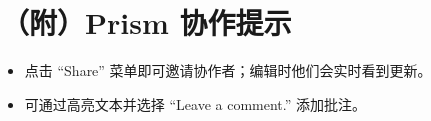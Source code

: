 \chapter{（附）Prism 协作提示}
\label{app:prism}
\begin{itemize}
  \item 点击 ``Share'' 菜单即可邀请协作者；编辑时他们会实时看到更新。
  \item 可通过高亮文本并选择 ``Leave a comment.'' 添加批注。
\end{itemize}